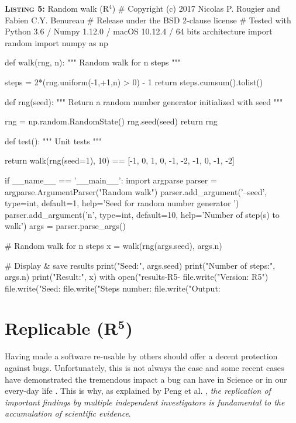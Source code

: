 \documentclass[a4paper,11pt]{article}
\begin{document}
\begin{code}{\textbf{\textsc{Listing 5:}} Random walk (R$^4$)}
# Copyright (c) 2017 Nicolas P. Rougier and Fabien C.Y. Benureau
# Release under the BSD 2-clause license
# Tested with Python 3.6 / Numpy 1.12.0 / macOS 10.12.4 / 64 bits architecture
import random
import numpy as np

def walk(rng, n):
    """ Random walk for n steps """

    steps = 2*(rng.uniform(-1,+1,n) > 0) - 1
    return steps.cumsum().tolist()

def rng(seed):
    """ Return a random number generator initialized with seed """ 
    
    rng = np.random.RandomState()
    rng.seed(seed)
    return rng

def test():
    """ Unit tests """

    return walk(rng(seed=1), 10) == [-1, 0, 1, 0, -1, -2, -1, 0, -1, -2]

if __name__ == '__main__':
    import argparse
    parser = argparse.ArgumentParser("Random walk")
    parser.add_argument('--seed', type=int, default=1,
                        help='Seed for random number generator ')
    parser.add_argument('n', type=int, default=10,
                        help='Number of step(s) to walk')
    args = parser.parse_args()

    # Random walk for n steps
    x = walk(rng(args.seed), args.n)

    # Display & save results
    print("Seed:", args.seed)
    print("Number of steps:", args.n)
    print("Result:",  x)
    with open("results-R5-%
        file.write("Version: R5")
        file.write("Seed: %
        file.write("Steps number: %
        file.write("Output: %
\end{code}


\section*{Replicable (R$^{\mathbf 5}$)}

Having made a software re-usable by others should offer a decent protection against bugs.
Unfortunately, this is not always the case and some recent cases have demonstrated the tremendous impact a bug can have in Science \citep{Eklund:2016} or in our every-day life \citep{Durumeric:2014}.
This is why, as explained by Peng et al. \cite{Peng:2006}, {\em the replication of important findings by multiple independent investigators is fundamental to the accumulation of scientific evidence}.\\
\end{document}

